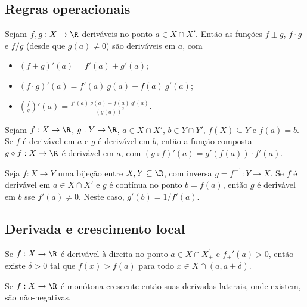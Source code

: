 \documentclass{article}
\begin{document}
\subsection{Regras operacionais}

\begin{thm}
    Sejam \(f, g: X \to \R\) deriváveis no ponto \(a \in X \cap X'\). Então as funções \(f \pm g\), \(f \cdot g\) e \(f / g\) (desde que \(g(a) \neq 0\)) são deriváveis em \(a\), com
    \begin{itemize}
        \item [(i)] \((f \pm g)'(a) = f'(a) \pm g'(a)\);
        \item [(ii)] \((f \cdot g)'(a) = f'(a)\ g(a) + f(a)\ g'(a)\);
        \item [(iii)] \(\displaystyle\left(\frac{f}{g}\right)'(a) = \frac{f'(a)\ g(a) - f(a)\ g'(a)}{(g(a))^2}\).
    \end{itemize}
\end{thm}

\begin{thm} 
    Sejam \(f: X \to \R\), \(g: Y \to \R\), \(a \in X \cap X'\), \(b \in Y \cap Y'\), \(f(X) \subseteq Y\) e \(f(a) = b\). Se \(f\) é derivável em \(a\) e \(g\) é derivável em \(b\), então a função composta \(g \circ f: X \to \R\) é derivável em \(a\), com \((g \circ f)'(a) = g'(f(a)) \cdot f'(a)\).
\end{thm}

\begin{cor}
    Seja \(f: X \to Y\) uma bijeção entre \(X, Y \subseteq \R\), com inversa \(g = f^{-1}: Y \to X\). Se \(f\) é derivável em \(a \in X \cap X'\) e \(g\) é contínua no ponto \(b = f(a)\), então \(g\) é derivável em \(b\) sse \(f'(a) \neq 0\). Neste caso, \(g'(b) = 1 / f'(a)\).
\end{cor}

\subsection{Derivada e crescimento local}

\begin{prop} \label{prop:crescimento_local}
    Se \(f: X \to \R\) é derivável à direita no ponto \(a \in X \cap X_{+}^{'}\) e \(f_{+}'(a) > 0\), então existe \(\delta > 0\) tal que \(f(x) > f(a)\) para todo \(x \in X \cap (a, a + \delta)\).
\end{prop}

\begin{cor} \label{cor:monotonicidade_derivada}
    Se \(f: X \to \R\) é monótona crescente então suas derivadas laterais, onde existem, são não-negativas.
\end{cor}
\end{document}
